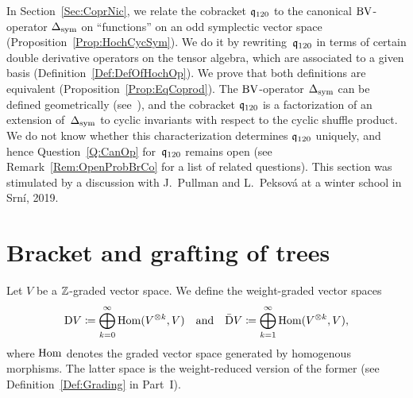 \documentclass[\MainFolder/Text.tex]{subfiles}
\begin{document}
In Section~\ref{Sec:CoprNic}, we relate the cobracket $\mathfrak{q}_{120}$ to the canonical $\mathrm{BV}$-operator $\operatorname{\Delta}_{\mathrm{sym}}$ on ``functions'' on an odd symplectic vector space (Proposition~\ref{Prop:HochCycSym}). We do it by rewriting~$\mathfrak{q}_{120}$ in terms of certain double derivative operators on the tensor algebra, which are associated to a given basis (Definition~\ref{Def:DefOfHochOp}). We prove that both definitions are equivalent (Proposition~\ref{Prop:EqCoprod}). The $\mathrm{BV}$-operator $\operatorname{\Delta}_{\mathrm{sym}}$ can be defined geometrically (see~\cite{Doubek2018}), and the cobracket $\mathfrak{q}_{120}$ is a factorization of an extension of~$\operatorname{\Delta}_{\mathrm{sym}}$ to cyclic invariants with respect to the cyclic shuffle product. We do not know whether this characterization determines $\mathfrak{q}_{120}$ uniquely, and hence Question~\ref{Q:CanOp} for~$\mathfrak{q}_{120}$ remains open (see Remark~\ref{Rem:OpenProbBrCo} for a list of related questions). This section was stimulated by a discussion with J.~Pullman and L.~Peksov\'a at a winter school in Srn\'i, 2019.%

\section{Bracket and grafting of trees}\label{Sec:LieBrHoch}

Let $V$ be a $\mathbb{Z}$-graded vector space. We define the weight-graded vector spaces
\begin{equation}\label{Eq:DefOfD}
\mathrm{D} V \coloneqq \bigoplus_{k=0}^\infty \mathrm{Hom}(V^{\otimes k},V)\quad\text{and}\quad \bar{\mathrm{D}} V \coloneqq \bigoplus_{k=1}^\infty \mathrm{Hom}(V^{\otimes k},V),
\end{equation}
where $\mathrm{Hom}$ denotes the graded vector space generated by homogenous morphisms. The latter space is the weight-reduced version of the former (see Definition~\ref{Def:Grading} in Part~I).
\end{document}
